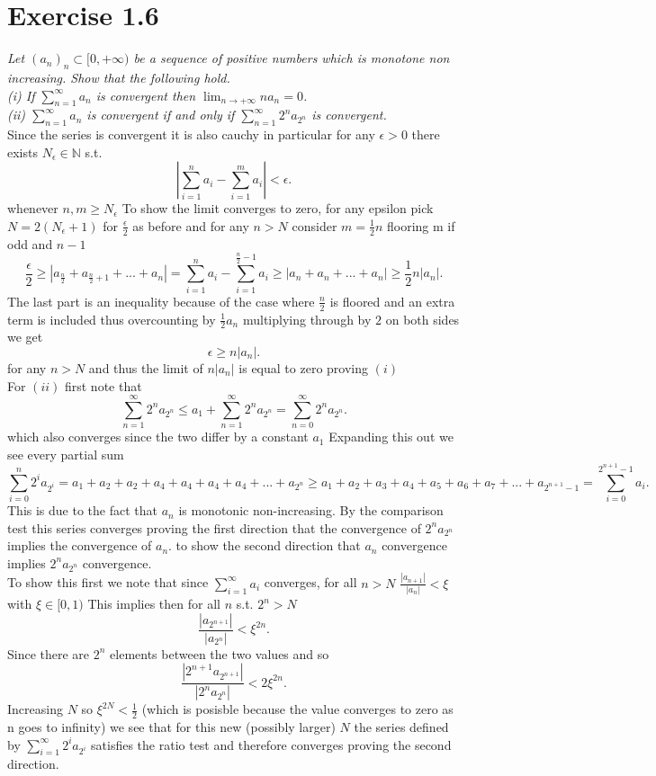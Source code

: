 \documentclass{amsart}
\begin{document}
    \section{Exercise 1.6}
    \emph{Let $(a_n)_n \subset [0,+\infty)$ be a sequence of positive numbers which is monotone
        non increasing. Show that the following hold.
        \\
        (i) If $\sum_{n=1}^{\infty}a_n$ is convergent then $\lim_{n\to +\infty}na_n =0$. \\
        (ii) $\sum_{n=1}^{\infty}a_n$ is convergent if and only if $\sum_{n=1}^{\infty}2^{n}a_{2^{n}}$ is convergent.\\
    }
    Since the series is convergent it is also cauchy in particular for any $\epsilon > 0$ there exists $N_\epsilon \in \mathbb{N}$ s.t.
    \[
    |\sum_{i=1}^{n}a_i - \sum_{i=1}^{m}a_i| < \epsilon
    .\] 
    whenever $n,m \ge N_\epsilon$
    To show the limit converges to zero, for any epsilon pick $N = 2(N_\epsilon+1)$ for $\frac{\epsilon}{2}$ as before and for any $n > N$ consider $m =  \frac{1}{2}n$ flooring m if odd and $n-1$
    \[
        \frac{\epsilon}{2} \ge |a_{\frac{n}{2}} + a_{\frac{n}{2}+1} + ... + a_{n}| = \sum_{i=1}^{n}a_i - \sum_{i=1}^{\frac{n}{2}-1}a_i \ge |a_{n} + a_{n} + ... + a_{n}| \ge \frac{1}{2}n|a_{n}| 
    .\] 
    The last part is an inequality because of the case where $\frac{n}{2}$ is floored and an extra term is included thus overcounting by $\frac{1}{2}a_n$
    multiplying through by $2$ on both sides we get
    \[
    \epsilon \ge n|a_n|
    .\] 
    for any $n > N$ and thus the limit of $n|a_n|$ is equal to zero proving $(i)$ \\
    For $(ii)$ first note that
     \[
         \sum_{n=1}^{\infty}2^{n}a_{2^{n}} \le a_1 + \sum_{n=1}^{\infty}2^{n}a_{2^{n}} = \sum_{n=0}^{\infty}2^{n}a_{2^{n}} 
    .\] which also converges since the two differ by a constant $a_1$
    Expanding this out we see every partial sum
    \[
        \sum_{i=0}^{n}2^{i}a_{2^{i}} = a_1 + a_2 + a_2 + a_4 + a_4 + a_4 + a_4 + ... + a_{2^{n}} \ge a_1 + a_2 + a_3 + a_4 + a_5 + a_6 + a_7 + ... + a_{2^{n+1}-1} = \sum_{i=0}^{2^{n+1}-1}a_i
    .\] 
    This is due to the fact that $a_n$ is monotonic non-increasing. By the comparison test this series converges proving the first direction that the convergence of $2^{n}a_{2^{n}}$ implies the convergence
    of $a_n$. to show the second direction that $a_n$ convergence implies $2^{n}a_{2^{n}}$ convergence.\\
    To show this first we note that since $\sum_{i=1}^{\infty}a_i$ converges, for all $n > N$ $\frac{|a_{n+1}|}{|a_n|} < \xi$ with $\xi \in [0,1)$
    This implies then for all $n$ s.t. $2^{n} > N$
    \[
        \frac{|a_{2^{n+1}}|}{|a_{2^{n}}|} < \xi^{2n}
    .\] 
    Since there are $2^{n}$ elements between the two values and so
    \[
        \frac{|2^{n+1}a_{2^{n+1}}|}{|2^{n}a_{2^{n}}|} < 2 \xi^{2n}
    .\] 
    Increasing  $N$ so $\xi^{2N} < \frac{1}{2}$ (which is posisble because the value converges to zero as n goes to infinity) we see that for this new (possibly larger) $N$ 
    the series defined by $\sum_{i=1}^{\infty}2^{i}a_{2^{i}}$ satisfies the ratio test and therefore converges proving the second direction.
\end{document}
